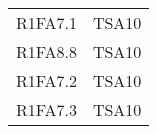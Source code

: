 {\begin{longtable}{C{4cm} C{4cm}}
R1FA7.1 & TSA10  \\
R1FA8.8 & TSA10  \\
R1FA7.2 & TSA10  \\
R1FA7.3 & TSA10  \\






\end{longtable}
}























